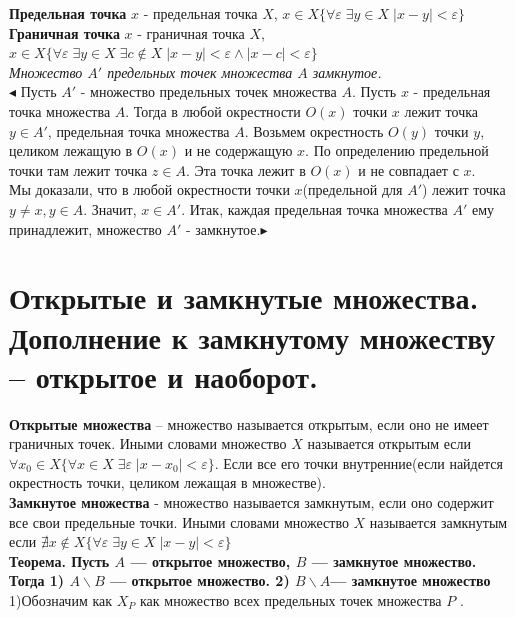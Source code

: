 \textbf{Предельная точка} $x$ - предельная точка $X$,  $x \in X \{\forall\varepsilon \; \exists y \in X\; |x-y|<\varepsilon\}  $\\
\textbf{Граничная точка} $x$ - граничная точка $X$,  $ x \in X \{ \forall\varepsilon \; \exists y \in X  \; \exists c\notin X\;|x-y|<\varepsilon \wedge |x-c|<\varepsilon\}  $\\
\textit{Множество $A'$ предельных точек множества $A$ замкнутое.}\\
$\blacktriangleleft$
Пусть $A'$ - множество предельных точек множества $A$. Пусть $x$ - предельная точка множества $A$. Тогда в любой окрестности $O(x)$ точки $x$ лежит точка $y \in A'$, предельная точка множества $A$. Возьмем окрестность $O(y)$ точки $y$, целиком лежащую в $O(x)$ и не содержащую $x$. По определению предельной точки там лежит точка $z \in A.$ Эта точка лежит в $O(x)$ и не совпадает с $x$. \\
Мы доказали, что в любой окрестности точки $x$(предельной для $A'$) лежит точка $y \neq x, y \in A.$ Значит, $x \in A'$. Итак, каждая предельная точка множества $A'$ ему принадлежит, множество $A'$ - замкнутое.$\blacktriangleright$


\section{Открытые и замкнутые множества. Дополнение к замкнутому множеству
-- открытое и наоборот.}

\textbf{Открытые множества} -- множество называется открытым, если оно не имеет граничных точек.  Иными словами множество $X$ называется открытым если $\forall x_{0}\in X\{\forall x \in X  \;\exists\varepsilon \; |x-x_{0}|<\varepsilon \} $. Если все его точки внутренние(если найдется окрестность точки, целиком лежащая в множестве).\\
\textbf{Замкнутое множества} - множество называется замкнутым, если оно содержит все свои предельные точки.  Иными словами множество $X$ называется замкнутым если $  \nexists x \notin X \{\forall\varepsilon \; \exists y \in X\; |x-y|<\varepsilon\}  $\\
\textbf{Теорема. Пусть $ A $ — открытое множество, $ B $ — замкнутое множество. Тогда 1) $ A \backslash B $
	— открытое множество. 2) $ B \backslash A  $— замкнутое множество}\\
1)Обозначим как $ X_{P} $ как множество всех предельных точек множества $ P $ .

